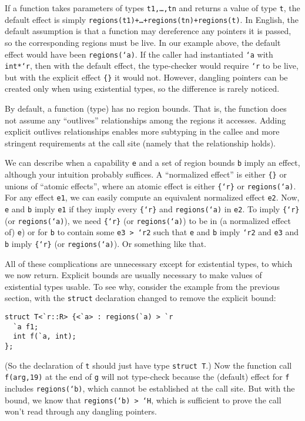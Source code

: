 If a function takes parameters of types \texttt{t1,\dots,tn} and
returns a value of type \texttt{t}, the default effect is simply
\texttt{regions(t1)+\dots+regions(tn)+regions(t)}.  In English, the
default assumption is that a function may dereference any pointers it
is passed, so the corresponding regions must be live.  In our example
above, the default effect would have been \texttt{regions(`a)}.  If
the caller had instantiated \texttt{`a} with \texttt{int*`r}, then
with the default effect, the type-checker would require \texttt{`r} to
be live, but with the explicit effect \texttt{\{\}} it would not.
However, dangling pointers can be created only when using existential
types, so the difference is rarely noticed.

By default, a function (type) has no region bounds.  That is, the
function does not assume any ``outlives'' relationships among the
regions it accesses.  Adding explicit outlives relationships enables
more subtyping in the callee and more stringent requirements at the
call site (namely that the relationship holds).

We can describe when a capability \texttt{e} and a set of region
bounds \texttt{b} imply an effect, although your intuition probably
suffices.  A ``normalized effect'' is either \texttt{\{\}} or unions
of ``atomic effects'', where an atomic effect is either
\texttt{\{`r\}} or \texttt{regions(`a)}.  For any effect \texttt{e1},
we can easily compute an equivalent normalized effect \texttt{e2}.
Now, \texttt{e} and \texttt{b} imply \texttt{e1} if they imply every
\texttt{\{`r\}} and \texttt{regions(`a)} in \texttt{e2}.  To imply
\texttt{\{`r\}} (or \texttt{regions(`a)}), we need \texttt{\{`r\}} (or
\texttt{regions(`a)}) to be in (a normalized effect of) \texttt{e}) or
for \texttt{b} to contain some \texttt{e3 > `r2} such that \texttt{e}
and \texttt{b} imply \texttt{`r2} and \texttt{e3} and \texttt{b} imply
\texttt{\{`r\}} (or \texttt{regions(`a)}).  Or something like that.

All of these complications are unnecessary except for existential
types, to which we now return.  Explicit bounds are usually necessary
to make values of existential types usable.  To see why, consider the
example from the previous section, with the \texttt{struct}
declaration changed to remove the explicit bound:
\begin{verbatim}  
struct T<`r::R> {<`a> : regions(`a) > `r 
  `a f1; 
  int f(`a, int); 
};
\end{verbatim}
(So the declaration of \texttt{t} should just have type \texttt{struct
  T}.)  Now the function call \texttt{f(arg,19)} at the end of
\texttt{g} will not type-check because the (default) effect for
\texttt{f} includes \texttt{regions(`b)}, which cannot be established
at the call site.  But with the bound, we know that
  \texttt{regions(`b) > `H}, which is sufficient to prove the call
  won't read through any dangling pointers.

